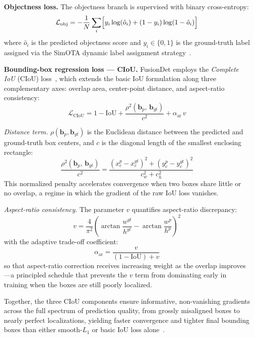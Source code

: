 \textbf{Objectness loss.}  The objectness branch is supervised
with binary cross-entropy:
\begin{equation}
    \mathcal{L}_{\text{obj}} =
    -\frac{1}{N}
    \sum_{i}\Bigl[
        y_{i}\log(\hat{o}_{i})
        + (1-y_{i})\log(1-\hat{o}_{i})
    \Bigr]
    \label{eq:obj}
\end{equation}
where $\hat{o}_{i}$ is the predicted objectness score and
$y_{i} \in \{0,1\}$ is the ground-truth label assigned via
the SimOTA dynamic label assignment strategy~\cite{ge2021yolox}.

\textbf{Bounding-box regression loss --- CIoU.}  FusionDet
employs the \textit{Complete IoU} (CIoU) loss~\cite{zheng2020distance},
which extends the basic IoU formulation along three
complementary axes: overlap area, center-point distance, and
aspect-ratio consistency:
\begin{equation}
    \mathcal{L}_{\text{CIoU}} =
    1 - \text{IoU}
    + \frac{\rho^{2}(\mathbf{b}_{p},\,\mathbf{b}_{gt})}{c^{2}}
    + \alpha_{\text{ar}}\,v
    \label{eq:ciou}
\end{equation}

\textit{Distance term.}
$\rho(\mathbf{b}_{p},\mathbf{b}_{gt})$ is the Euclidean
distance between the predicted and ground-truth box centers,
and $c$ is the diagonal length of the smallest enclosing
rectangle:
\begin{equation}
    \frac{\rho^{2}(\mathbf{b}_{p},\,\mathbf{b}_{gt})}{c^{2}}
    = \frac{(x_c^{p} - x_c^{gt})^{2} +
            (y_c^{p} - y_c^{gt})^{2}}
           {c_{w}^{2} + c_{h}^{2}}
    \label{eq:dist}
\end{equation}
This normalized penalty accelerates convergence when two boxes
share little or no overlap, a regime in which the gradient of
the raw IoU loss vanishes.

\textit{Aspect-ratio consistency.}  The parameter $v$
quantifies aspect-ratio discrepancy:
\begin{equation}
    v = \frac{4}{\pi^{2}}
    \left(
        \arctan\frac{w^{gt}}{h^{gt}}
        - \arctan\frac{w^{p}}{h^{p}}
    \right)^{\!2}
    \label{eq:v}
\end{equation}
with the adaptive trade-off coefficient:
\begin{equation}
    \alpha_{\text{ar}} = \frac{v}{(1 - \text{IoU}) + v}
    \label{eq:alpha_ar}
\end{equation}
so that aspect-ratio correction receives increasing weight as
the overlap improves---a principled schedule that prevents the
$v$ term from dominating early in training when the boxes are
still poorly localized.

Together, the three CIoU components ensure informative,
non-vanishing gradients across the full spectrum of prediction
quality, from grossly misaligned boxes to nearly perfect
localizations, yielding faster convergence and tighter final
bounding boxes than either smooth-$L_1$ or basic IoU loss
alone~\cite{zheng2020distance}.
